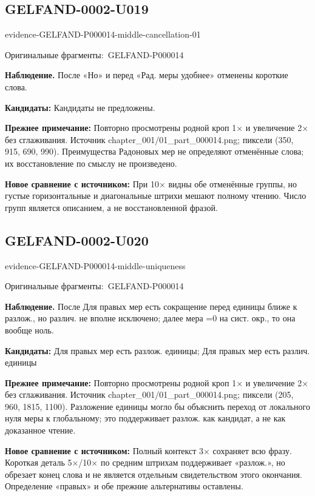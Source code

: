 \documentclass[11pt]{article}
\newcommand{\EvidenceBlock}[4]{%
 \par\smallskip\noindent\begin{minipage}{\linewidth}
 \begin{minipage}[t]{.47\linewidth}\vspace{0pt}\centering
 \csname evidence-#1-#2\endcsname\par
 {\scriptsize\SourceCropCaption\ #1}\par
 \end{minipage}\hfill
 \begin{minipage}[t]{.49\linewidth}\vspace{0pt}\raggedright
 {\small\color{orange!65!black}\textbf{#4} #3}\par
 \end{minipage}
 \end{minipage}\par\smallskip}
\newcommand{\SourceCropCaption}{Оригинальные фрагменты:}\newcommand{\ReadingCaption}{Сомнительное чтение.}\newcommand{\IncompleteCaption}{Неразобранный фрагмент.}\newcommand{\DiagramCaption}{Рисунок и набранное описание.}
\begin{document}
\subsection*{GELFAND-0002-U019}
\EvidenceBlock{GELFAND-P000014}{middle-cancellation-01}{После «Но» и перед «Рад. меры удобнее» отменены короткие слова.}{Наблюдение.}
\par\smallskip\noindent\textbf{Кандидаты: } Кандидаты не предложены.\par
\par\smallskip\noindent\textbf{Прежнее примечание: } Повторно просмотрены родной кроп 1× и увеличение 2× без сглаживания. Источник chapter\_001/01\_part\_000014.png; пиксели (350, 915, 690, 990). Преимущества Радоновых мер не определяют отменённые слова; их восстановление по смыслу не произведено.\par
\par\smallskip\noindent\textbf{Новое сравнение с источником: } При 10× видны обе отменённые группы, но густые горизонтальные и диагональные штрихи мешают полному чтению. Число групп является описанием, а не восстановленной фразой.\par

\subsection*{GELFAND-0002-U020}
\EvidenceBlock{GELFAND-P000014}{middle-uniqueness}{После Для правых мер есть сокращение перед единицы ближе к разлож., но различ. не вполне исключено; далее мера =0 на сист. окр., то она вообще ноль.}{Наблюдение.}
\par\smallskip\noindent\textbf{Кандидаты: } Для правых мер есть разлож. единицы; Для правых мер есть различ. единицы\par
\par\smallskip\noindent\textbf{Прежнее примечание: } Повторно просмотрены родной кроп 1× и увеличение 2× без сглаживания. Источник chapter\_001/01\_part\_000014.png; пиксели (205, 960, 1815, 1100). Разложение единицы могло бы объяснить переход от локального нуля меры к глобальному; это поддерживает разлож. как кандидат, а не как доказанное чтение.\par
\par\smallskip\noindent\textbf{Новое сравнение с источником: } Полный контекст 3× сохраняет всю фразу. Короткая деталь 5×/10× по средним штрихам поддерживает «разлож.», но обрезает конец слова и не является отдельным свидетельством этого окончания. Определение «правых» и обе прежние альтернативы оставлены.\par
\end{document}
